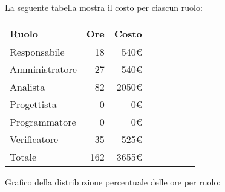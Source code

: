 La seguente tabella mostra il costo per ciascun ruolo:
\begin{table}[H]
    \begin{tabularx}{\linewidth}{X|rrrrrrr}
    \rowcolor{gray!30}Ruolo & Ore & Costo \\
    \hline
    Responsabile                            & 18 & 540€ \\
    \rowcolor{gray!10}Amministratore        & 27 & 540€ \\
    Analista                                & 82 & 2050€ \\
    \rowcolor{gray!10}Progettista           & 0 & 0€ \\
    Programmatore                           & 0 & 0€ \\
    \rowcolor{gray!10}Verificatore          & 35 & 525€ \\
    \hline Totale                           & 162 & 3655€ \\ 
    \end{tabularx}
\end{table}

Grafico della distribuzione percentuale delle ore per ruolo:
\begin{center}
\end{center}